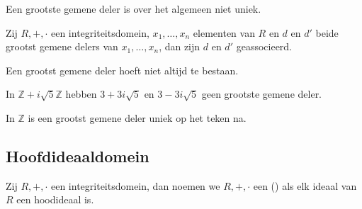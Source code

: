\documentclass[main.tex]{subfiles}
\begin{document}
\begin{opm}
  Een grootste gemene deler is over het algemeen niet uniek.
\end{opm}

\begin{ei}
  Zij $R,+,\cdot$ een integriteitsdomein, $x_{1},\dotsc,x_{n}$ elementen van $R$ en $d$ en $d'$ beide grootst gemene delers van $x_{1},\dotsc,x_{n}$, dan zijn $d$ en $d'$ geassocieerd.
\end{ei}

\begin{opm}
  Een grootst gemene deler hoeft niet altijd te bestaan.
 
  In $\mathbb{Z}+i\sqrt{5}\mathbb{Z}$ hebben $3+3i\sqrt{5}$ en $3-3i\sqrt{5}$ geen grootste gemene deler.
\end{opm}

\begin{opm}
  In $\mathbb{Z}$ is een grootst gemene deler uniek op het teken na.
\end{opm}

\subsection{Hoofdideaaldomein}
\label{sec:hoofdideaaldomein}

\begin{de}
  Zij $R,+,\cdot$ een integriteitsdomein, dan noemen we $R,+,\cdot$ een  () als elk ideaal van $R$ een hoodideaal is.
\end{de}
\end{document}
